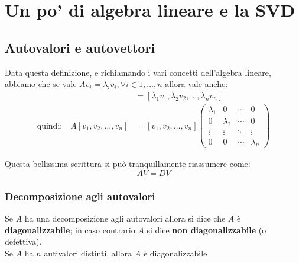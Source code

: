 \chapter{Un po' di algebra lineare e la SVD}

\section{Autovalori e autovettori}
Data questa definizione, e richiamando i vari concetti dell'algebra lineare, abbiamo che se vale $Av_{i} = \lambda_{i}v_{i},\forall i\in {1,\dots, n}$ allora vale anche:
\begin{align*}
    [A v_1, A v_2, \dots, A v_n] &= [\lambda_1 v_1, \lambda_2 v_2, \dots, \lambda_n v_n] \\
    \text{quindi:} \quad A[v_1, v_2, \dots, v_n] &= [v_1, v_2, \dots, v_n] \begin{pmatrix}
        \lambda_1 & 0 & \cdots & 0 \\
        0 & \lambda_2 & \cdots & 0 \\
        \vdots & \vdots & \ddots & \vdots \\
        0 & 0 & \cdots & \lambda_n
        \end{pmatrix}        
\end{align*}

Questa bellissima scrittura si può tranquillamente riassumere come: \[AV=DV\]

\subsection{Decomposizione agli autovalori}
Se $A$ ha una decomposizione agli autovalori
allora si dice che $A$ è \textbf{diagonalizzabile}; in
caso contrario $A$ si dice \textbf{non
diagonalizzabile} (o defettiva). \\

Se $A$ ha $n$ autivalori distinti, allora $A$ è diagonalizzabile

